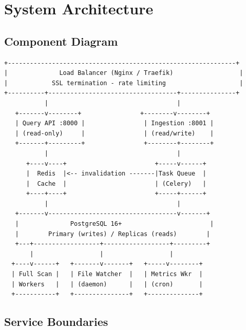 \chapter{System Architecture}

\section{Component Diagram}

\begin{lstlisting}[language={},title={High-level component map}]
+--------------------------------------------------------------+
|              Load Balancer (Nginx / Traefik)                  |
|            SSL termination - rate limiting                    |
+----------+-----------------------------------+---------------+
           |                                   |
   +-------v--------+                +--------v--------+
   | Query API :8000 |                | Ingestion :8001 |
   | (read-only)     |                | (read/write)    |
   +-------+---------+                +--------+--------+
           |                                   |
      +----v----+                        +-----v------+
      |  Redis  |<-- invalidation -------|Task Queue  |
      |  Cache  |                        | (Celery)   |
      +----+----+                        +-----+------+
           |                                   |
   +-------v-----------------------------------v-------+
   |              PostgreSQL 16+                        |
   |        Primary (writes) / Replicas (reads)        |
   +---+------------------+------------------+---------+
       |                  |                  |
  +----v------+   +-------v-------+   +-----v--------+
  | Full Scan |   | File Watcher  |   | Metrics Wkr  |
  | Workers   |   | (daemon)      |   | (cron)       |
  +-----------+   +---------------+   +--------------+
\end{lstlisting}

\section{Service Boundaries}


